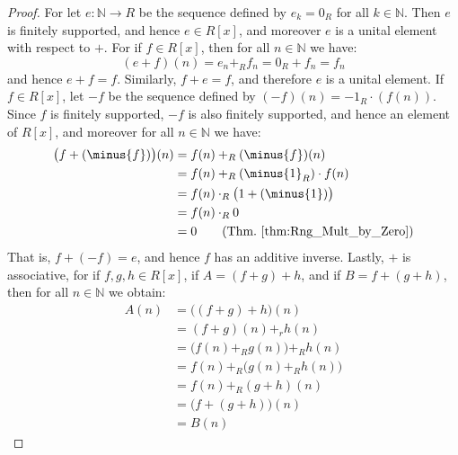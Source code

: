     \begin{proof}
        For let $e:\mathbb{N}\rightarrow{R}$ be the sequence defined by
        $e_{k}=0_{R}$ for all $k\in\mathbb{N}$. Then $e$ is finitely
        supported, and hence $e\in{R}[x]$, and moreover $e$ is a unital
        element with respect to $+$. For if $f\in{R}[x]$, then for all
        $n\in\mathbb{N}$ we have:
        \begin{equation}
            (e+f)(n)=e_{n}+_{R}f_{n}=0_{R}+f_{n}=f_{n}
        \end{equation}
        and hence $e+f=f$. Similarly, $f+e=f$, and therefore $e$ is a unital
        element. If $f\in{R}[x]$, let $\minus{f}$ be the sequence
        defined by $(\minus{f})(n)=\minus{1}_{R}\cdot(f(n))$. Since $f$ is
        finitely supported, $\minus{f}$ is also finitely supported, and
        hence an element of $R[x]$, and moreover for all $n\in\mathbb{N}$
        we have:
        \begin{subequations}
            \begin{align}
                \big(f+(\minus{f})\big)(n)&=f(n)+_{R}(\minus{f})(n)\\
                    &=f(n)+_{R}(\minus{1}_{R})\cdot{f}(n)\\
                    &=f(n)\cdot_{R}\big(1+(\minus{1})\big)\\
                    &=f(n)\cdot_{R}0\\
                    &=0\tag{Thm.~\ref{thm:Rng_Mult_by_Zero}}
            \end{align}
        \end{subequations}
        That is, $f+(\minus{f})=e$, and hence $f$ has an additive inverse.
        Lastly, $+$ is associative, for if $f,g,h\in{R}[x]$, if
        $A=(f+g)+h$, and if $B=f+(g+h)$, then for all $n\in\mathbb{N}$ we
        obtain:
        \begin{subequations}
            \begin{align}
                A(n)&=\big((f+g)+h\big)(n)\\
                    &=(f+g)(n)+_{r}h(n)\\
                    &=\big(f(n)+_{R}g(n)\big)+_{R}h(n)\\
                    &=f(n)+_{R}\big(g(n)+_{R}h(n)\big)\\
                    &=f(n)+_{R}(g+h)(n)\\
                    &=\big(f+(g+h)\big)(n)\\
                    &=B(n)
            \end{align}

\end{subequations}
\end{proof}
